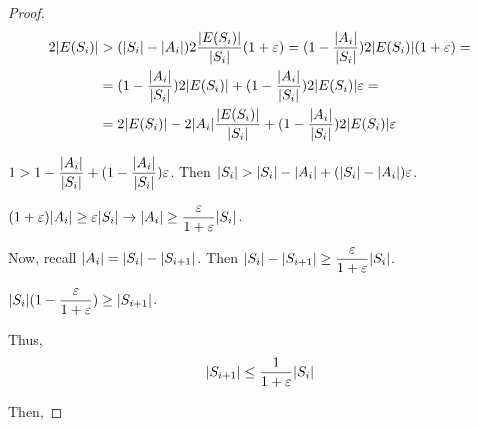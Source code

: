 \begin{proof}
        \begin{equation*}
            \begin{split}
                2 \vert E(S_i) \vert  &> (\vert S_i \vert - \vert A_i \vert) 2 \dfrac{\vert E(S_i) \vert}{\vert S_i \vert} (1+\varepsilon) = (1 - \dfrac{\vert A_i \vert}{\vert S_i \vert}) 2 \vert E(S_i) \vert (1 + \varepsilon) =\\
                                        &= (1 - \dfrac{\vert A_i \vert}{\vert S_i \vert}) 2 \vert E(S_i) \vert + (1 - \dfrac{\vert A_i \vert}{\vert S_i \vert}) 2 \vert E(S_i) \vert \varepsilon =\\
                                        &= 2 \vert E(S_i) \vert - 2 \vert A_i \vert \dfrac{\vert E(S_i) \vert}{\vert S_i \vert} + (1 - \dfrac{\vert A_i \vert}{\vert S_i \vert}) 2 \vert E(S_i) \vert \varepsilon
            \end{split}
        \end{equation*}

        $1 > 1 - \dfrac{\vert A_i \vert}{\vert S_i \vert} + (1 - \dfrac{\vert A_i \vert}{\vert S_i \vert})\varepsilon$.
        Then $\vert S_i \vert > \vert S_i \vert - \vert A_i \vert + (\vert S_i \vert - \vert A_i \vert)\varepsilon$.

        $(1+\varepsilon) \vert A_i \vert \geq \varepsilon \vert S_i \vert \rightarrow \vert A_i \vert \geq \dfrac{\varepsilon}{1 + \varepsilon} \vert S_i \vert$.

        Now, recall $\vert A_i \vert = \vert S_i \vert - \vert S_{i+1} \vert$. Then $\vert S_i \vert - \vert S_{i+1} \vert \geq \dfrac{\varepsilon}{1+\varepsilon} \vert S_i \vert$.

        $\vert S_i \vert (1 - \dfrac{\varepsilon}{1+\varepsilon}) \geq \vert S_{i+1} \vert$.

        Thus,
        \[ \vert S_{i+1} \vert \leq \dfrac{1}{1 + \varepsilon} \vert S_i \vert \]

        Then,


\end{proof}
